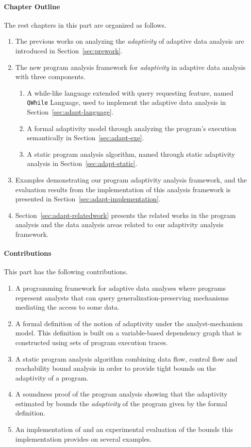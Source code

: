 \paragraph{Chapter Outline}
The rest chapters in this part are organized as follows. 
\begin{enumerate}
   \item The previous works on analyzing the \emph{adaptivity} of adaptive data analysis are introduced in Section~\ref{sec:prework}.
   
   \item The new program analysis framework for \emph{adaptivity} in adaptive data analysis with three components.
   \begin{enumerate}
      \item A while-like language extended with query requesting feature, named {\tt QWhile} Language, 
      used to implement the adaptive data analysis in Section~\ref{sec:adapt-language}.
      \item A formal adaptivity model through analyzing the program's execution semantically in Section~\ref{sec:adapt-exe}.
      \item A static program analysis algorithm, named {\THESYSTEM} through static adaptivity analysis in Section~\ref{sec:adapt-static}.
   \end{enumerate}
   \item Examples demonstrating our program adaptivity analysis framework,
   and the evaluation results from the implementation
   of this analysis framework is presented in Section~\ref{sec:adapt-implementation}.
   \item Section~\ref{sec:adapt-relatedwork} presents the related works in the program analysis and the data analysis areas
   related to our adaptivity analysis framework.
\end{enumerate}


\paragraph{Contributions}
This part has the following contributions.
\begin{enumerate}
   \item A programming framework for adaptive data analyses where programs represent analysts that can query generalization-preserving mechanisms mediating the access to some data. 
   \item 
   A formal definition of the notion of adaptivity under the analyst-mechanism model. 
   This definition is built on a variable-based dependency graph that is constructed using sets of program execution traces.
   \item 
   A static program analysis algorithm {\THESYSTEM} combining data flow, control flow and  reachability bound analysis in order to provide tight bounds on the adaptivity of a program.
   \item A soundness proof of the program analysis showing that the adaptivity estimated by {\THESYSTEM} bounds the \emph{adaptivity} of the program given by the formal definition. 
   \item An implementation of {\THESYSTEM} and an experimental evaluation of the bounds this implementation provides on several examples.
\end{enumerate}